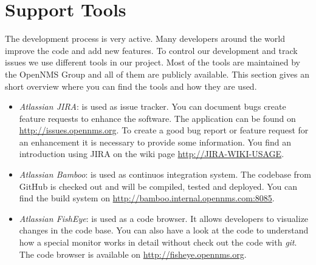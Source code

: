 \section{Support Tools}
The development process is very active. Many developers around the world improve the code and add new features. To control our development and track issues we use different tools in our project. Most of the tools are maintained by the OpenNMS Group and all of them are publicly available. This section gives an short overview where you can find the tools and how they are used.

\begin{itemize}
  \item \emph{Atlassian JIRA}: is used as issue tracker. You can document bugs create feature requests to enhance the software. The application can be found on \url{http://issues.opennms.org}. To create a good bug report or feature request for an enhancement it is necessary to provide some information. You find an introduction using JIRA on the wiki page \url{http://JIRA-WIKI-USAGE}.
  \item \emph{Atlassian Bamboo}: is used as continuos integration system. The codebase from GitHub is checked out and will be compiled, tested and deployed. You can find the build system on \url{http://bamboo.internal.opennms.com:8085}.
  \item \emph{Atlassian FishEye}: is used as a code browser. It allows developers to visualize changes in the code base. You can also have a look at the code to understand how a special monitor works in detail without check out the code with \emph{git}. The code browser is available on \url{http://fisheye.opennms.org}.
\end{itemize}
